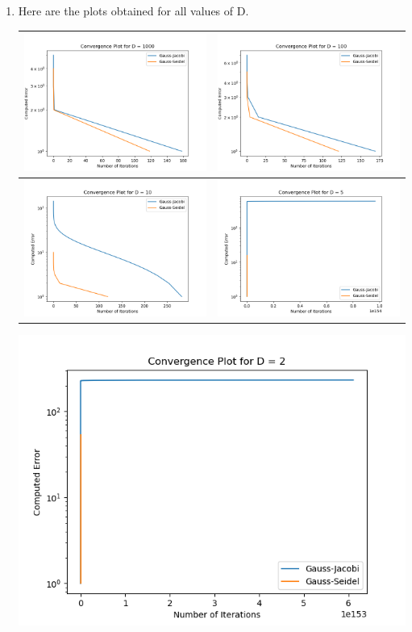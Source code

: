 \documentclass{article}
\begin{document}
\begin{enumerate}
    \item

    Here are the plots obtained for all values of D. 

    \begin{center}
    
    \begin{tabular}{| c | c |}
    \hline
    \includegraphics[width=.40\textwidth]{D1000plot.png} & \includegraphics[width=.40\textwidth]{D100plot.png} \\
    \hline
    \includegraphics[width=.40\textwidth]{D10plot.png} & \includegraphics[width=.40\textwidth]{D5plot.png} \\
    \hline
    \end{tabular}
    \includegraphics[width=.4\textwidth]{D2plot.png}
    

\end{center}
\end{enumerate}
\end{document}
